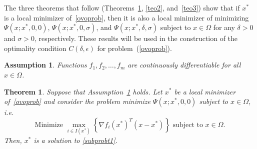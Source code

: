 \documentclass[11pt]{article}
\newtheorem{theorem}{Theorem}[section]
\newtheorem{assumption}{Assumption}
\begin{document}
The three theorems that follow (Theorems~\ref{teo1}, \ref{teo2}, and~\ref{teo3}) show that if $x^*$ is a local minimizer of~\eqref{ovoprob}, then it is also a local minimizer of minimizing $\Psi(x; x^*,0,0)$, $\Psi(x; x^*,0,\sigma)$, and $\Psi(x; x^*,\delta,\sigma)$ subject to $x \in \Omega$ for any $\delta>0$ and $\sigma>0$, respectively. These results will be used in the construction of the optimality condition $C(\delta,\epsilon)$ for problem~(\ref{ovoprob}).

\begin{assumption} \label{a1}
Functions $f_1, f_2, \dots, f_m$ are continuously differentiable for all $x \in \Omega$.
\end{assumption}

\begin{theorem} \label{teo1}
Suppose that Assumption~\ref{a1} holds. Let $x^*$ be a local minimizer of~\eqref{ovoprob} and consider the problem minimize $\Psi(x;x^*,0,0)$ subject to $x \in \Omega$, i.e.\
\begin{equation}\label{subprobt1}
\mbox{Minimize } \max_{i \in I(x^*)} \left\{ \nabla f_i(x^*)^T (x - x^*) \right\} \mbox{ subject to } x \in \Omega.
\end{equation}
Then, $x^*$ is a solution to \eqref{subprobt1}.
\end{theorem}
\end{document}
